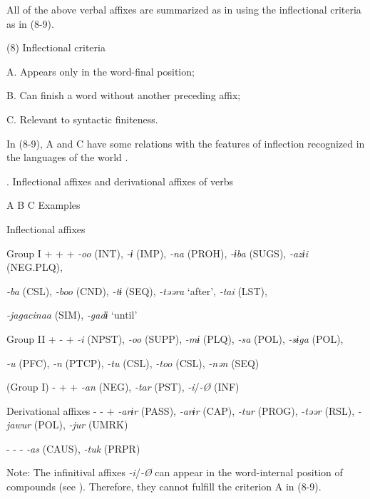  All of the above verbal affixes are summarized as in  using the inflectional criteria as in (8-9).

(8)  Inflectional criteria

  A.  Appears only in the word-final position;

  B.  Can finish a word without another preceding affix;

  C.  Relevant to syntactic finiteness.

In (8-9), A and C have some relations with the features of inflection recognized in the languages of the world \citep[90]{Haspelmath2010}.

\begin{styleBeschriftung}
\textmd{}\textmd{. Inflectional affixes and derivational affixes of verbs}
\end{styleBeschriftung}

  A  B  C  Examples

Inflectional affixes        

  Group I  +  +  +  \textit{{}-oo} (INT), \textit{{}-ɨ} (IMP), \textit{{}-na} (PROH), \textit{{}-ɨba} (SUGS), \textit{{}-azɨi} (NEG.PLQ),

\textit{{}-ba} (CSL), \textit{{}-boo} (CND), \textit{{}-tɨ} (SEQ), \textit{{}-təəra} ‘after’, \textit{{}-tai} (LST),

\textit{{}-jagacinaa} (SIM), \textit{{}-gadɨ} ‘until’

  Group II  +  {}-  +  \textit{{}-i} (NPST), \textit{{}-oo} (SUPP), \textit{{}-mɨ} (PLQ), \textit{{}-sa} (POL), \textit{{}-sɨga} (POL),

\textit{{}-u} (PFC), \textit{{}-n} (PTCP), \textit{{}-tu} (CSL), \textit{{}-too} (CSL), \textit{{}-nən} (SEQ)

  (Group I)  {}-  +  +  \textit{{}-an} (NEG), \textit{-tar} (PST), \textit{{}-i}/\textit{{}-Ø} (INF)

Derivational affixes  {}-  {}-  +  \textit{{}-arɨr} (PASS), \textit{-arɨr} (CAP), \textit{-tur} (PROG), \textit{{}-təər} (RSL), \textit{{}-jawur} (POL), \textit{{}-jur} (UMRK)

  {}-  {}-  {}-  \textit{{}-as} (CAUS), \textit{{}-tuk} (PRPR)

Note: The infinitival affixes \textit{{}-i}/\textit{{}-Ø} can appear in the word-internal position of compounds (see ). Therefore, they cannot fulfill the criterion A in (8-9).

